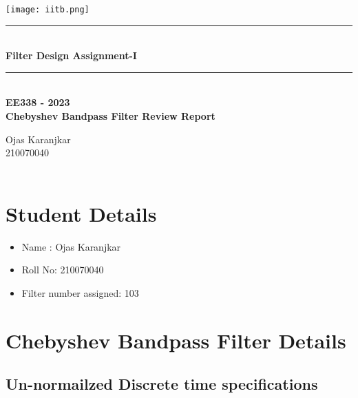 \documentclass{article}
\begin{document}
\begin{titlepage}
\begin{center}
    \vspace*{\fill}
\texttt{[image: iitb.png]}\\
[4 cm]
    \rule{12.5cm}{0.75mm}\\
    \huge{\bfseries Filter Design Assignment-I}
    \rule{12.5cm}{0.75mm}\\
    [0.5cm]
   {\textbf {EE338 - 2023 \\
    Chebyshev Bandpass Filter Review Report}}\\
    [2.5cm]
\end{center}
\begin{flushleft}
   {\huge
    Ojas Karanjkar \\
    210070040 \\
     \\}
    \end{flushleft}
\end{titlepage}
\tableofcontents
\thispagestyle{empty}
\clearpage
{}

\newpage

\section{Student Details}
\begin{itemize}
    \item Name : Ojas Karanjkar
    \item Roll No: 210070040
    \item Filter number assigned: 103
\end{itemize}

\section{Chebyshev Bandpass Filter Details}
\subsection{Un-normailzed Discrete time specifications}
\end{document}
